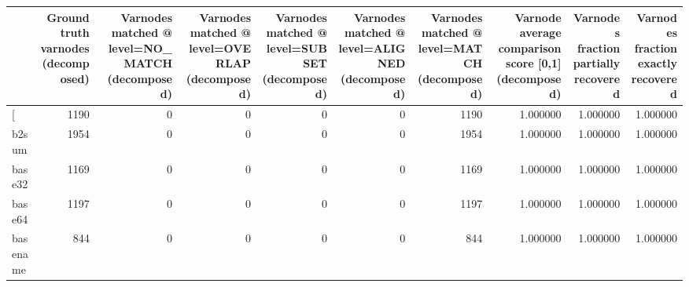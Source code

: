 \begin{tabular}{lrrrrrrrrr}
\toprule
{} &  Ground truth varnodes (decomposed) &  Varnodes matched @ level=NO\_MATCH (decomposed) &  Varnodes matched @ level=OVERLAP (decomposed) &  Varnodes matched @ level=SUBSET (decomposed) &  Varnodes matched @ level=ALIGNED (decomposed) &  Varnodes matched @ level=MATCH (decomposed) &  Varnode average comparison score [0,1] (decomposed) &  Varnodes fraction partially recovered &  Varnodes fraction exactly recovered \\
\midrule
[         &                                1190 &                                               0 &                                              0 &                                             0 &                                              0 &                                         1190 &                                           1.000000 &                               1.000000 &                             1.000000 \\
b2sum     &                                1954 &                                               0 &                                              0 &                                             0 &                                              0 &                                         1954 &                                           1.000000 &                               1.000000 &                             1.000000 \\
base32    &                                1169 &                                               0 &                                              0 &                                             0 &                                              0 &                                         1169 &                                           1.000000 &                               1.000000 &                             1.000000 \\
base64    &                                1197 &                                               0 &                                              0 &                                             0 &                                              0 &                                         1197 &                                           1.000000 &                               1.000000 &                             1.000000 \\
basename  &                                 844 &                                               0 &                                              0 &                                             0 &                                              0 &                                          844 &                                           1.000000 &                               1.000000 &                             1.000000 \\

\end{tabular}
